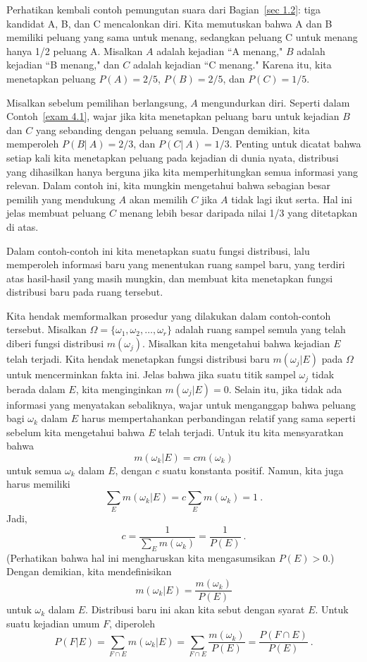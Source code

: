\begin{example}\label{exam 4.2}
Perhatikan kembali contoh pemungutan suara dari Bagian~\ref{sec 1.2}: tiga kandidat A, B,
dan C mencalonkan diri.  Kita memutuskan bahwa A dan B memiliki peluang yang sama untuk
menang, sedangkan peluang C untuk menang hanya 1/2 peluang A.  Misalkan $A$ adalah kejadian ``A
menang," $B$ adalah kejadian ``B menang," dan $C$ adalah kejadian ``C menang."  Karena itu, kita menetapkan
peluang $P(A) = 2/5$, $P(B) = 2/5$, dan $P(C) = 1/5$.  
\par
Misalkan sebelum pemilihan berlangsung, $A$ mengundurkan diri.  Seperti dalam Contoh~\ref{exam
4.1}, wajar jika kita menetapkan peluang baru untuk kejadian $B$ dan $C$ yang
sebanding dengan peluang semula.  Dengan demikian, kita memperoleh $P(B|~A) = 2/3$, dan
$P(C|~A) = 1/3$.  Penting untuk dicatat bahwa setiap kali kita menetapkan peluang pada kejadian di dunia nyata,
distribusi yang dihasilkan hanya berguna jika kita memperhitungkan semua informasi yang
relevan.  Dalam contoh ini, kita mungkin mengetahui bahwa sebagian besar pemilih yang mendukung $A$ akan memilih
$C$ jika $A$ tidak lagi ikut serta.  Hal ini jelas membuat peluang
$C$ menang lebih besar daripada nilai 1/3 yang ditetapkan di atas.
\end{example}

Dalam contoh-contoh ini kita menetapkan suatu fungsi distribusi, lalu memperoleh informasi
baru yang menentukan ruang sampel baru, yang terdiri atas hasil-hasil yang
masih mungkin, dan membuat kita menetapkan fungsi distribusi baru pada
ruang tersebut.

Kita hendak memformalkan prosedur yang dilakukan dalam contoh-contoh tersebut.  Misalkan
$\Omega = \{\omega_1,\omega_2,\dots,\omega_r\}$ adalah ruang sampel semula
yang telah diberi fungsi distribusi $m(\omega_j)$.  Misalkan kita mengetahui bahwa
kejadian $E$ telah terjadi.  Kita hendak menetapkan fungsi distribusi baru
$m(\omega_j|E)$ pada $\Omega$ untuk mencerminkan fakta ini.  Jelas bahwa jika suatu titik sampel
$\omega_j$ tidak berada dalam $E$, kita menginginkan $m(\omega_j|E) = 0$.  Selain itu, jika tidak ada
informasi yang menyatakan sebaliknya, wajar untuk menganggap bahwa
peluang bagi $\omega_k$ dalam $E$ harus mempertahankan perbandingan relatif yang sama
seperti sebelum kita mengetahui bahwa $E$ telah terjadi.  Untuk itu kita mensyaratkan
bahwa
$$
m(\omega_k|E) = cm(\omega_k)
$$
untuk semua $\omega_k$ dalam $E$, dengan $c$ suatu konstanta positif.  Namun, kita juga harus
memiliki
$$
\sum_E m(\omega_k|E) = c\sum_E m(\omega_k) = 1\ .
$$
Jadi,
$$
c = \frac 1{\sum_E m(\omega_k)} = \frac 1{P(E)}\ .
$$
(Perhatikan bahwa hal ini mengharuskan kita mengasumsikan $P(E) > 0$.)  Dengan demikian, kita
mendefinisikan
$$
m(\omega_k|E) = \frac {m(\omega_k)}{P(E)}
$$
untuk $\omega_k$ dalam $E$.  Distribusi baru ini akan kita sebut  dengan syarat $E$.  Untuk suatu kejadian umum $F$, diperoleh
$$
P(F|E) = \sum_{F \cap E} m(\omega_k|E) = \sum_{F \cap E}\frac {m(\omega_k)}{P(E)} = 
\frac {P(F \cap E)}{P(E)}\ .
$$

